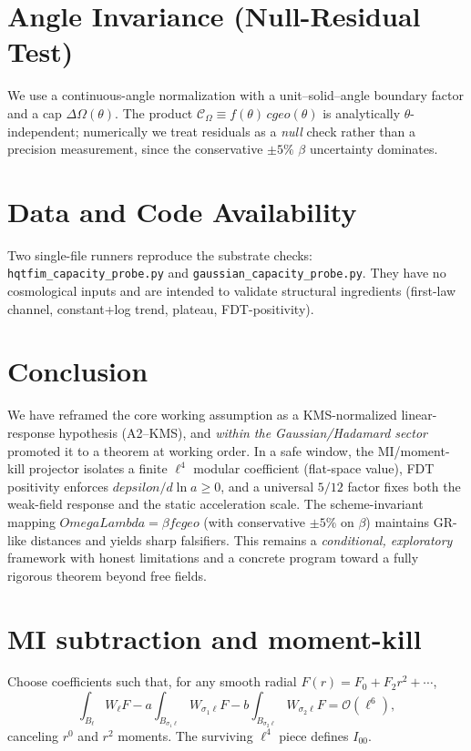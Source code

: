 \documentclass[aps,prd,onecolumn,superscriptaddress,nofootinbib]{revtex4-2}
\def\OmL{OmegaLambda}%
\def\cgeo{cgeo}%
\def\eps{epsilon}%
\def\Omega_\Lambda{OmegaLambda}%
\providecommand{\OmL}{\Omega_\Lambda}
\providecommand{\cgeo}{c_{\rm geo}}
\providecommand{\eps}{\varepsilon}
\begin{document}
\section{Angle Invariance (Null-Residual Test)}
\label{sec:theta}
We use a continuous-angle normalization with a unit–solid–angle boundary factor and a cap $\Delta\Omega(\theta)$. The product $\mathcal C_\Omega\equiv f(\theta)\, \cgeo(\theta)$ is analytically $\theta$-independent; numerically we treat residuals as a \emph{null} check rather than a precision measurement, since the conservative $\pm 5\%$ $\beta$ uncertainty dominates.

\section{Data and Code Availability}
\label{sec:data}
Two single-file runners reproduce the substrate checks: \texttt{hqtfim_capacity_probe.py} and \texttt{gaussian_capacity_probe.py}. They have no cosmological inputs and are intended to validate structural ingredients (first-law channel, constant+log trend, plateau, FDT-positivity).

\section{Conclusion}
We have reframed the core working assumption as a KMS-normalized linear-response hypothesis (A2–KMS), and \emph{within the Gaussian/Hadamard sector} promoted it to a theorem at working order. In a safe window, the MI/moment-kill projector isolates a finite $\ell^4$ modular coefficient (flat-space value), FDT positivity enforces $d\eps/d\ln a\ge 0$, and a universal $5/12$ factor fixes both the weak-field response and the static acceleration scale. The scheme-invariant mapping $\OmL=\beta f \cgeo$ (with conservative $\pm 5\%$ on $\beta$) maintains GR-like distances and yields sharp falsifiers. This remains a \emph{conditional, exploratory} framework with honest limitations and a concrete program toward a fully rigorous theorem beyond free fields.

\appendix

\section{MI subtraction and moment-kill}
\label{app:MI}
Choose coefficients such that, for any smooth radial $F(r)=F_0+F_2 r^2+\cdots$,
\[
\int_{B_\ell}W_\ell F - a\!\int_{B_{\sigma_1\ell}}W_{\sigma_1\ell}F - b\!\int_{B_{\sigma_2\ell}}W_{\sigma_2\ell}F
=\mathcal O(\ell^6),
\]
canceling $r^0$ and $r^2$ moments. The surviving $\ell^4$ piece defines $I_{00}$.
\end{document}
